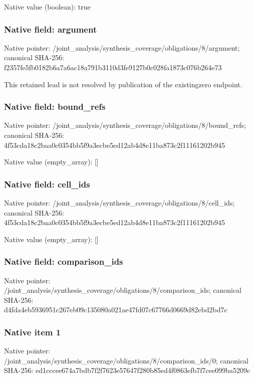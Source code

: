 \documentclass[10pt,a4paper]{article}
\begin{document}
Native value (boolean): true

\subsubsection{Native field: argument}
Native pointer: /joint\_\allowbreak{}analysis/synthesis\_\allowbreak{}coverage/obligations/8/argument; canonical SHA-256: f2357fe5fb0182b6a7a6ac18a791b3110d3fe9127b0c028fa1873c076b264e73

\begingroup\raggedright\sloppy This retained lead is not resolved by publication of the existingzero endpoint.\par\endgroup

\subsubsection{Native field: bound\_\allowbreak{}refs}
Native pointer: /joint\_\allowbreak{}analysis/synthesis\_\allowbreak{}coverage/obligations/8/bound\_\allowbreak{}refs; canonical SHA-256: 4f53cda18c2baa0c0354bb5f9a3ecbe5ed12ab4d8e11ba873c2f11161202b945

Native value (empty\_\allowbreak{}array): []

\subsubsection{Native field: cell\_\allowbreak{}ids}
Native pointer: /joint\_\allowbreak{}analysis/synthesis\_\allowbreak{}coverage/obligations/8/cell\_\allowbreak{}ids; canonical SHA-256: 4f53cda18c2baa0c0354bb5f9a3ecbe5ed12ab4d8e11ba873c2f11161202b945

Native value (empty\_\allowbreak{}array): []

\subsubsection{Native field: comparison\_\allowbreak{}ids}
Native pointer: /joint\_\allowbreak{}analysis/synthesis\_\allowbreak{}coverage/obligations/8/comparison\_\allowbreak{}ids; canonical SHA-256: d4fda4eb5936951c267eb09c135080a021ae47fd07c67766d0669d82ebd2bd7c

\subsubsection{Native item 1}
Native pointer: /joint\_\allowbreak{}analysis/synthesis\_\allowbreak{}coverage/obligations/8/comparison\_\allowbreak{}ids/0; canonical SHA-256: ed1cccee674a7bdb7f2f7623e57647f280b85ed4f0863efb7f7cee099ba5209c
\end{document}
